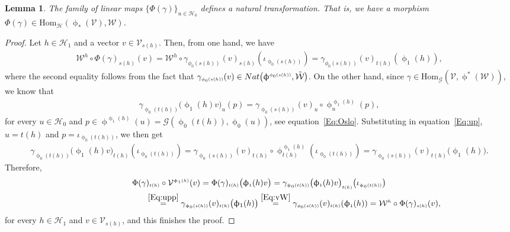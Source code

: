 \documentclass[11pt]{article}
\numberwithin{equation}{section}
\newtheorem{Lemma}[Theorem]{Lemma}
\renewcommand{\hom}[3]{\mathrm{Hom}_{\Sscript{#1}}\left(#2, #3\right)}
\newcommand{\Ho}{\cH_{\Sscript{0}}}
\newcommand{\Ha}{\cH_{\Sscript{1}}}
\newcommand{\cG}{{\mathcal G}}
\newcommand{\cH}{{\mathcal H}}
\newcommand{\cV}{{\mathcal V}}
\newcommand{\cW}{{\mathcal W}}
\newcommand{\Sscript}[1]{\scriptscriptstyle{#1}}
\newcommand{\phia}{\upphi_{\Sscript{1}}}
\begin{document}
\begin{Lemma}\label{lema:Phi}The family of linear maps $\{ \Phi(\gamma)\}_{\Sscript{u \in \Ho}}$ defines a natural transformation. That is, we have a morphism $\Phi(\gamma) \in \hom{\cH}{\upphi_{*}(\cV)}{\cW}$.
\end{Lemma}
\begin{proof}Let $h \in \Ha$ and a vector $v \in \cV_{\Sscript{s(h)}}$. Then, from one hand, we have
\begin{gather}\label{Eq:vW}
\cW^{\Sscript{h}} \circ \Phi(\gamma)_{\Sscript{s(h)}}(v) = \cW^{\Sscript{h}} \circ \gamma_{\Sscript{\phi_0(s(h))}}(v)_{\Sscript{s(h)}}(\iota_{\Sscript{\upphi_{0}(s(h))}}) =\gamma_{\Sscript{\phi_0(s(h))}}(v)_{
\Sscript{t(h)}}(\upphi_{\Sscript{1}}(h)),
\end{gather}
where the second equality follows from the fact that $\gamma_{\Sscript{\phi_0(s(h))}}(v) \in {\rm Nat}\big(\upphi^{\Sscript{\phi_0(s(h))}}, \tilde{\cW}\big)$. On the other hand, since $\gamma \in \hom{\cG}{\cV}{\upphi^*(\cW)}$, we know that
\begin{gather}\label{Eq:up}
\gamma_{\Sscript{\upphi_0(t(h))}}\big( \upphi_{\Sscript{1}}(h) v \big)_{\Sscript{u}} (p) = \gamma_{\Sscript{\upphi_0(s(h))}}( v)_{\Sscript{u}} \circ \upphi^{\Sscript{\upphi_1(h)}}_{\Sscript{u}}(p),
\end{gather}
for every $u \in \Ho$ and $p \in \upphi^{\Sscript{\upphi_1(h)}} (u)=\cG( \upphi_{\Sscript{0}}(t(h)),\upphi_{\Sscript{0}}(u) )$, see equation~\eqref{Eq:Oslo}. Substituting in equation~\eqref{Eq:up}, $u= t(h)$ and $p = \iota_{\Sscript{\upphi_0(t(h))}}$, we then get
\begin{gather}\label{Eq:upp}
\gamma_{\Sscript{\upphi_0(t(h))}}\big( \upphi_{\Sscript{1}}(h) v
\big)_{\Sscript{t(h)}} (\iota_{\Sscript{\upphi_0(t(h))}}) =
\gamma_{\Sscript{\upphi_0(s(h))}}(v)_{\Sscript{t(h)}}
\circ \upphi^{\Sscript{\upphi_1(h)}}_{\Sscript{t(h)}}(\iota_{\Sscript{\upphi_0(t(h))}})
= \gamma_{\Sscript{\upphi_0(s(h))}}(v)_{\Sscript{t(h)}}
\big( \upphi_1(h) \big).
\end{gather}
Therefore,
\begin{gather*}
\Phi(\gamma)_{\Sscript{t(h)}}\circ \cV^{\Sscript{\phia(h)}} (v) = \Phi(\gamma)_{\Sscript{t(h)}}\big( \phia(h) v \big) = \gamma_{\Sscript{\upphi_0(t(h))}}\big( \phia(h) v\big)_{\Sscript{t(h)}}\big(\iota_{\Sscript{\upphi_0(t(h))}} \big)\\
\hphantom{\Phi(\gamma)_{\Sscript{t(h)}}\circ \cV^{\Sscript{\phia(h)}} (v)}{}\overset{\eqref{Eq:upp}}{=} \gamma_{\Sscript{\upphi_0(s(h))}}(v)_{\Sscript{t(h)}}
\big( \upphi_1(h) \big) \overset{\eqref{Eq:vW}}{=} \gamma_{\Sscript{\phi_0(s(h))}}(v)_{ \Sscript{t(h)}}(\upphi_{\Sscript{1}}(h)) = \cW^{\Sscript{h}} \circ \Phi(\gamma)_{\Sscript{s(h)}}(v),
\end{gather*}
for every $h \in \Ha$ and $v \in \cV_{\Sscript{s(h)}}$, and this finishes the proof.
\end{proof}
\end{document}
